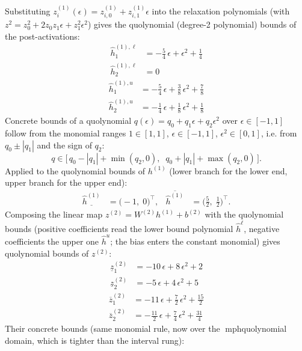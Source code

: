 \documentclass[11pt]{article}
\begin{document}
Substituting $z^{(1)}_i(\epsilon) = z^{(1)}_{i,0} + z^{(1)}_{i,1} \epsilon$ into the relaxation
polynomials (with $z^2 = z_0^2 + 2 z_0 z_1 \epsilon + z_1^2 \epsilon^2$) gives the quolynomial
(degree-2 polynomial) bounds of the post-activations:
\begin{align*}
\hat{h}^{(1),\ell}_{1} &= -\frac{5}{4}\,\epsilon + \epsilon^2 + \frac{1}{4} \\
\hat{h}^{(1),\ell}_{2} &= 0
\end{align*}
\begin{align*}
\hat{h}^{(1),u}_{1} &= -\frac{5}{4}\,\epsilon + \frac{3}{8}\,\epsilon^2 + \frac{7}{8} \\
\hat{h}^{(1),u}_{2} &= -\frac{1}{4}\,\epsilon + \frac{1}{8}\,\epsilon^2 + \frac{1}{8}
\end{align*}
Concrete bounds of a quolynomial $q(\epsilon) = q_0 + q_1 \epsilon + q_2 \epsilon^2$ over
$\epsilon \in [-1, 1]$ follow from the monomial ranges $1 \in [1, 1]$, $\epsilon \in [-1, 1]$,
$\epsilon^2 \in [0, 1]$, i.e. from $q_0 \pm |q_1|$ and the sign of $q_2$:
\begin{equation*}
q \in \bigl[\, q_0 - |q_1| + \min(q_2, 0), \;\; q_0 + |q_1| + \max(q_2, 0) \,\bigr].
\end{equation*}
Applied to the quolynomial bounds of $h^{(1)}$ (lower branch for the lower end, upper branch for the upper end):
\begin{align*}
\underline{\hat{h}^{(1)}} &= \bigl(-1,\; 0\bigr)^{\!\top}, & \overline{\hat{h}^{(1)}} &= \bigl(\frac{5}{2},\; \frac{1}{2}\bigr)^{\!\top}.
\end{align*}
Composing the linear map $z^{(2)} = W^{(2)} h^{(1)} + b^{(2)}$ with the quolynomial bounds
(positive coefficients read the lower bound polynomial $\hat{h}^{\ell}$, negative coefficients the
upper one $\hat{h}^{u}$; the bias enters the constant monomial) gives quolynomial bounds of
$z^{(2)}$:
\begin{align*}
\underline{z}^{(2)}_{1} &= -10\,\epsilon + 8\,\epsilon^2 + 2 \\
\underline{z}^{(2)}_{2} &= -5\,\epsilon + 4\,\epsilon^2 + 5
\end{align*}
\begin{align*}
\overline{z}^{(2)}_{1} &= -11\,\epsilon + \frac{7}{2}\,\epsilon^2 + \frac{15}{2} \\
\overline{z}^{(2)}_{2} &= -\frac{11}{2}\,\epsilon + \frac{7}{4}\,\epsilon^2 + \frac{31}{4}
\end{align*}
Their concrete bounds (same monomial rule, now over the mph{quolynomial} domain, which is tighter than the interval rung):
\end{document}
